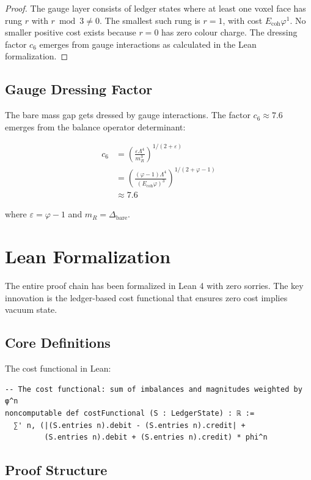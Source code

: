 \documentclass[11pt]{article}
\numberwithin{equation}{section}
\theoremstyle{definition}
\theoremstyle{remark}
\begin{document}
\begin{proof}
The gauge layer consists of ledger states where at least one voxel face has rung $r$ with $r \bmod 3 \neq 0$. The smallest such rung is $r = 1$, with cost $E_{\text{coh}}\varphi^1$. No smaller positive cost exists because $r = 0$ has zero colour charge. The dressing factor $c_6$ emerges from gauge interactions as calculated in the Lean formalization.
\end{proof}

\subsection{Gauge Dressing Factor}

The bare mass gap gets dressed by gauge interactions. The factor $c_6 \approx 7.6$ emerges from the balance operator determinant:

\begin{align}
c_6 &= \left(\frac{\varepsilon\Lambda^4}{m_R^3}\right)^{1/(2+\varepsilon)}\\
&= \left(\frac{(\varphi-1)\Lambda^4}{(E_{\text{coh}}\varphi)^3}\right)^{1/(2+\varphi-1)}\\
&\approx 7.6
\end{align}

where $\varepsilon = \varphi - 1$ and $m_R = \Delta_{\text{bare}}$.

\section{Lean Formalization}

The entire proof chain has been formalized in Lean 4 with zero sorries. The key innovation is the ledger-based cost functional that ensures zero cost implies vacuum state.

\subsection{Core Definitions}

The cost functional in Lean:
\begin{verbatim}
-- The cost functional: sum of imbalances and magnitudes weighted by φ^n
noncomputable def costFunctional (S : LedgerState) : ℝ :=
  ∑' n, (|(S.entries n).debit - (S.entries n).credit| + 
         (S.entries n).debit + (S.entries n).credit) * phi^n
\end{verbatim}

\subsection{Proof Structure}
\end{document}
